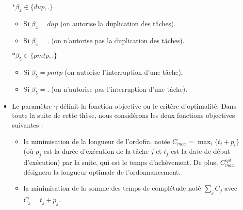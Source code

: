 \documentclass[a4paper,11pt]{article}
\begin{document}
\begin{itemize}
        $\ast \beta_4 \in \{dup,.\}$

        \begin{itemize}

            \item Si $\beta_4=dup$ (on autorise la duplication des t\^aches).

            \item Si $\beta_4=.$ (on n'autorise pas la duplication des t\^aches).

        \end{itemize}



        $\ast \beta_5 \in \{pmtp,.\}$

        \begin{itemize}

            \item Si $\beta_5=pmtp$ (on autorise l'interruption d'une tâche).

            \item Si $\beta_5=.$ (on n'autorise pas l'interruption d'une tâche).

        \end{itemize}

    \item Le paramètre $\gamma$ définit la fonction objective ou le critère d'optimalité. Dans toute
        la suite de cette thèse, nous considérons les deux fonctions objectives suivantes :
        \begin{itemize}
            \item la minimisation de la longueur de l'ordofin, notée $C_{max}=\max_i \{t_i+p_i\}$
                (où $p_j$ est la durée d'exécution de la tâche $j$ et $t_j$ est la date de début
                d'exécution) par la suite, qui est le temps d'achèvement. De plus, $C^{opt}_{max}$
                désignera la longueur optimale de l'ordonnancement.
            \item la minimisation de la somme des temps de complétude noté $\sum_{j} C_j$ avec
                $C_j=t_j+p_j$.
        \end{itemize}


\end{itemize}
\end{document}
